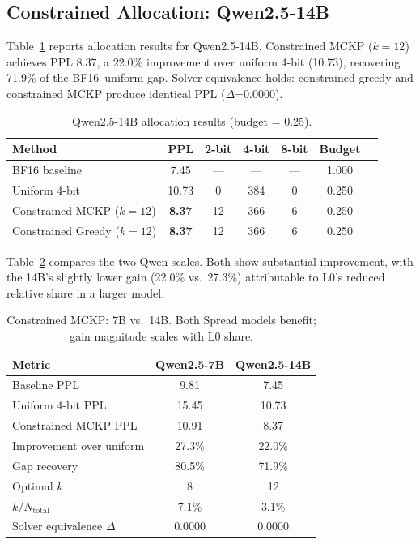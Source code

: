 \documentclass[11pt,a4paper]{article}
\begin{document}
\subsection{Constrained Allocation: Qwen2.5-14B}
\label{sec:alloc14b}

Table~\ref{tab:alloc14b} reports allocation results for Qwen2.5-14B.
Constrained MCKP ($k{=}12$) achieves PPL 8.37, a 22.0\% improvement over uniform 4-bit (10.73), recovering 71.9\% of the BF16--uniform gap.
Solver equivalence holds: constrained greedy and constrained MCKP produce identical PPL ($\Delta$=0.0000).

\begin{table}[h]
\centering
\caption{Qwen2.5-14B allocation results (budget = 0.25).}
\label{tab:alloc14b}
\begin{tabular}{lcccccc}
\toprule
\textbf{Method} & \textbf{PPL} & \textbf{2-bit} & \textbf{4-bit} & \textbf{8-bit} & \textbf{Budget} \\
\midrule
BF16 baseline              & 7.45  & --- & --- & --- & 1.000 \\
Uniform 4-bit              & 10.73 & 0   & 384 & 0   & 0.250 \\
Constrained MCKP ($k{=}12$)  & \textbf{8.37}  & 12  & 366 & 6   & 0.250 \\
Constrained Greedy ($k{=}12$) & \textbf{8.37}  & 12  & 366 & 6   & 0.250 \\
\bottomrule
\end{tabular}
\end{table}

Table~\ref{tab:7bvs14b} compares the two Qwen scales.
Both show substantial improvement, with the 14B's slightly lower gain (22.0\% vs.\ 27.3\%) attributable to L0's reduced relative share in a larger model.

\begin{table}[h]
\centering
\caption{Constrained MCKP: 7B vs.\ 14B. Both Spread models benefit; gain magnitude scales with L0 share.}
\label{tab:7bvs14b}
\begin{tabular}{lcc}
\toprule
\textbf{Metric} & \textbf{Qwen2.5-7B} & \textbf{Qwen2.5-14B} \\
\midrule
Baseline PPL             & 9.81   & 7.45   \\
Uniform 4-bit PPL        & 15.45  & 10.73  \\
Constrained MCKP PPL     & 10.91  & 8.37   \\
Improvement over uniform & 27.3\% & 22.0\% \\
Gap recovery             & 80.5\% & 71.9\% \\
Optimal $k$              & 8      & 12     \\
$k / N_\text{total}$     & 7.1\%  & 3.1\%  \\
Solver equivalence $\Delta$ & 0.0000 & 0.0000 \\
\bottomrule
\end{tabular}
\end{table}
\end{document}
